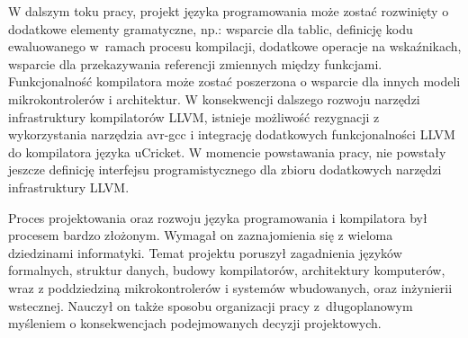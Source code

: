 W dalszym toku pracy, projekt języka programowania może zostać rozwinięty o dodatkowe elementy gramatyczne, np.: wsparcie dla tablic, definicję kodu ewaluowanego w~ramach procesu kompilacji, dodatkowe operacje na wskaźnikach, wsparcie dla przekazywania referencji zmiennych między funkcjami.
Funkcjonalność kompilatora może zostać poszerzona o wsparcie dla innych modeli mikrokontrolerów i architektur. W konsekwencji dalszego rozwoju narzędzi infrastruktury kompilatorów LLVM, istnieje możliwość rezygnacji z wykorzystania narzędzia avr-gcc i integrację dodatkowych funkcjonalności LLVM do kompilatora języka uCricket. W momencie powstawania pracy, nie powstały jeszcze definicję interfejsu programistycznego dla zbioru dodatkowych narzędzi infrastruktury LLVM.

Proces projektowania oraz rozwoju języka programowania i kompilatora był procesem bardzo złożonym. Wymagał on zaznajomienia się z wieloma dziedzinami informatyki. Temat projektu poruszył zagadnienia języków formalnych, struktur danych, budowy kompilatorów, architektury komputerów, wraz z poddziedziną mikrokontrolerów i systemów wbudowanych, oraz inżynierii wstecznej. Nauczył on także sposobu organizacji pracy z~długoplanowym myśleniem o konsekwencjach podejmowanych decyzji projektowych.

